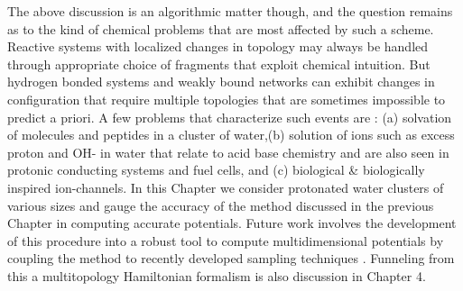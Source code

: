 The above discussion is an algorithmic matter though, and the question remains as to the
 kind of chemical problems that are most affected by such a scheme. Reactive systems with
localized changes in topology may always be handled through appropriate choice of fragments
that exploit chemical intuition. But hydrogen bonded systems and weakly bound networks can
exhibit changes in configuration that require multiple topologies that are sometimes
impossible to predict a priori. A few problems that characterize such events are :
(a) solvation of molecules and peptides in a cluster of water,(b) solution of ions such
as excess proton and OH- in water that relate to acid base chemistry and are also seen in
protonic conducting systems and fuel cells, and (c) biological & biologically inspired
ion-channels. In this Chapter we consider protonated water clusters of various sizes and
gauge the accuracy of the method discussed in the previous Chapter in computing accurate
potentials. Future work involves the development of this procedure into a robust tool to
compute multidimensional potentials by coupling the method to recently developed sampling
techniques \cite{sumner2007quantum, jakowski2006computational, li2014vibrational,
hocker2011shannon, shannonIsoprene}. Funneling from this a multitopology Hamiltonian
formalism is also discussion in Chapter 4.


